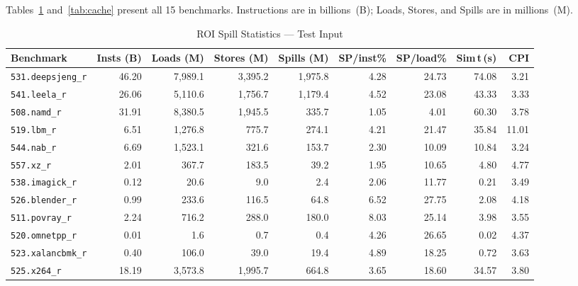 \documentclass[conference]{IEEEtran}
\begin{document}
Tables~\ref{tab:spill} and~\ref{tab:cache} present all 15 benchmarks.
Instructions are in billions~(B); Loads, Stores, and Spills are in millions~(M).


\begin{landscape}
\begin{table}[p]
\centering\caption{ROI Spill Statistics --- Test Input}\label{tab:spill}\small
\begin{tabular}{lrrrrrrrr}
\toprule
\textbf{Benchmark} & \textbf{Insts (B)} & \textbf{Loads (M)} & \textbf{Stores (M)}
  & \textbf{Spills (M)} & \textbf{SP/inst\%} & \textbf{SP/load\%}
  & \textbf{Sim\,t\,(s)} & \textbf{CPI} \\
\midrule

\texttt{531.deepsjeng\_r} & 46.20 & 7,989.1 & 3,395.2 & 1,975.8 & 4.28 & 24.73 & 74.08 & 3.21 \\

\texttt{541.leela\_r} & 26.06 & 5,110.6 & 1,756.7 & 1,179.4 & 4.52 & 23.08 & 43.33 & 3.33 \\

\texttt{508.namd\_r} & 31.91 & 8,380.5 & 1,945.5 & 335.7 & 1.05 & 4.01 & 60.30 & 3.78 \\

\texttt{519.lbm\_r} & 6.51 & 1,276.8 & 775.7 & 274.1 & 4.21 & 21.47 & 35.84 & 11.01 \\

\texttt{544.nab\_r} & 6.69 & 1,523.1 & 321.6 & 153.7 & 2.30 & 10.09 & 10.84 & 3.24 \\

\texttt{557.xz\_r} & 2.01 & 367.7 & 183.5 & 39.2 & 1.95 & 10.65 & 4.80 & 4.77 \\

\texttt{538.imagick\_r} & 0.12 & 20.6 & 9.0 & 2.4 & 2.06 & 11.77 & 0.21 & 3.49 \\

\texttt{526.blender\_r} & 0.99 & 233.6 & 116.5 & 64.8 & 6.52 & 27.75 & 2.08 & 4.18 \\

\texttt{511.povray\_r} & 2.24 & 716.2 & 288.0 & 180.0 & 8.03 & 25.14 & 3.98 & 3.55 \\

\texttt{520.omnetpp\_r} & 0.01 & 1.6 & 0.7 & 0.4 & 4.26 & 26.65 & 0.02 & 4.37 \\

\texttt{523.xalancbmk\_r} & 0.40 & 106.0 & 39.0 & 19.4 & 4.89 & 18.25 & 0.72 & 3.63 \\

\texttt{525.x264\_r} & 18.19 & 3,573.8 & 1,995.7 & 664.8 & 3.65 & 18.60 & 34.57 & 3.80 \\


\end{tabular}
\end{table}
\end{landscape}
\end{document}
